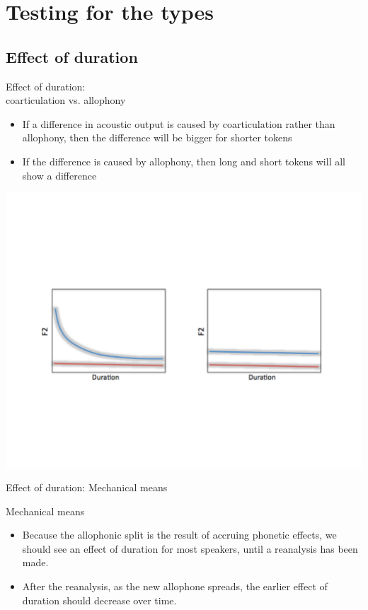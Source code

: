 \documentclass[hyperref={pdfpagelabels=false}]{beamer}
\begin{document}
\section{Testing for the types}

\subsection{Effect of duration}
\begin{frame}{Effect of duration: \\ coarticulation vs. allophony}
	\begin{itemize} 
		\item If a difference in acoustic output is caused by coarticulation rather than allophony, then the difference will be bigger for shorter tokens
		\item If the difference is caused by allophony, then long and short tokens will all show a difference
	\end{itemize}
	\begin{center}

	\includegraphics[trim=2cm 2cm 2cm 6cm, clip=true, width=1\textwidth]{DurationEx.pdf}

\end{center}\end{frame}

\begin{frame}{Effect of duration: Mechanical means}
	\begin{block}{Mechanical means}
		\begin{itemize}
			\item Because the allophonic split is the result of accruing phonetic effects, we should see an effect of duration for most speakers, until a reanalysis has been made.
			\item After the reanalysis, as the new allophone spreads, the earlier effect of duration should decrease over time.
		\end{itemize}
	\end{block}	
\end{frame} 
\end{document}
